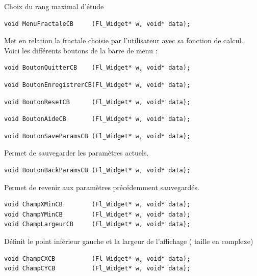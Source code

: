 \documentclass[a4paper,11pt]{article} \usepackage[T1]{fontenc} \usepackage[utf8]{inputenc} \usepackage[francais]{babel}
\begin{document}
Choix du rang maximal d'étude

\begin{lstlisting}
void MenuFractaleCB     (Fl_Widget* w, void* data);\end{lstlisting}

Met en relation la fractale choisie par l'utilisateur avec sa fonction de calcul.\\

Voici les différents boutons de la barre de menu :
\begin{lstlisting}
void BoutonQuitterCB    (Fl_Widget* w, void* data);\end{lstlisting}

\begin{lstlisting}
void BoutonEnregistrerCB(Fl_Widget* w, void* data);\end{lstlisting}

\begin{lstlisting}
void BoutonResetCB      (Fl_Widget* w, void* data);\end{lstlisting}

\begin{lstlisting}
void BoutonAideCB       (Fl_Widget* w, void* data);\end{lstlisting}

\begin{lstlisting}
void BoutonSaveParamsCB (Fl_Widget* w, void* data);\end{lstlisting}

Permet de sauvegarder les paramètres actuels.

\begin{lstlisting}
void BoutonBackParamsCB (Fl_Widget* w, void* data);\end{lstlisting}

Permet de revenir aux paramètres précédemment sauvegardés.

\begin{lstlisting}
void ChampXMinCB        (Fl_Widget* w, void* data);
void ChampYMinCB        (Fl_Widget* w, void* data);
void ChampLargeurCB     (Fl_Widget* w, void* data);\end{lstlisting}

Définit le point inférieur gauche et la largeur de l'affichage ( taille en complexe)

\begin{lstlisting}
void ChampCXCB          (Fl_Widget* w, void* data);
void ChampCYCB          (Fl_Widget* w, void* data);\end{lstlisting}
\end{document}

